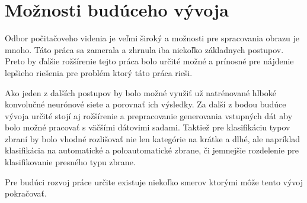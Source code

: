 
\section{Možnosti budúceho vývoja}

Odbor počitačoveho videnia je veľmi široký a možnosti pre spracovania obrazu je mnoho.
Táto práca sa zamerala a zhrnula iba niekoľko základnych postupov.
Preto by ďalšie rožšírenie tejto práca bolo určité možné a prínosné pre nájdenie lepšieho riešenia pre problém ktorý táto práca rieši.

Ako jeden z dalších postupov by bolo možné využiť už natrénované hlboké konvolučné neurónové siete a porovnať ich výsledky.
Za další z bodou budúce vývoja určité stojí aj rožšírenie a prepracovanie generovania vstupných dát aby bolo
    možné pracovať s väčšími dátovimi sadami.
Taktiež pre klasifikáciu typov zbraní by bolo vhodné rozlišovať nie len kategórie na krátke a dlhé, ale napríklad klasifikácia
    na automatické a poloautomatické zbrane, či jemnejšie rozdelenie pre klasifikovanie presného typu zbrane.

Pre budúci rozvoj práce určite existuje niekoľko smerov ktorými môže tento vývoj pokračovať.
